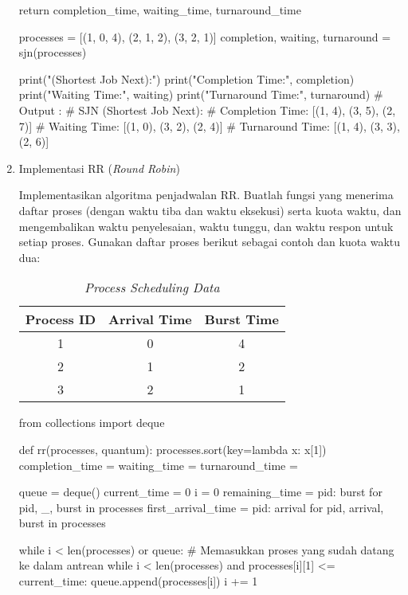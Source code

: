 \documentclass[12pt]{article}
\begin{document}
\begin{enumerate}
\begin{python}
    return completion_time, waiting_time, turnaround_time

processes = [(1, 0, 4), (2, 1, 2), (3, 2, 1)]
completion, waiting, turnaround = sjn(processes)

print("\nSJN (Shortest Job Next):")
print("Completion Time:", completion)
print("Waiting Time:", waiting)
print("Turnaround Time:", turnaround)
# Output : 
# SJN (Shortest Job Next):
# Completion Time: [(1, 4), (3, 5), (2, 7)]
# Waiting Time: [(1, 0), (3, 2), (2, 4)]
# Turnaround Time: [(1, 4), (3, 3), (2, 6)]
\end{python}
        
    \item Implementasi RR (\textit{Round Robin})
        \par  Implementasikan algoritma penjadwalan RR. Buatlah fungsi yang menerima daftar proses (dengan waktu tiba dan waktu eksekusi) serta kuota waktu, dan mengembalikan waktu penyelesaian, waktu tunggu, dan waktu respon untuk setiap proses. Gunakan daftar proses berikut sebagai contoh dan kuota waktu dua:
        \begin{table}[h!]
        \centering
        \begin{tabular}{|c|c|c|}
        \hline
        \textbf{Process ID} & \textbf{Arrival Time} & \textbf{Burst Time} \\ \hline
        1 & 0 & 4 \\ \hline
        2 & 1 & 2 \\ \hline
        3 & 2 & 1 \\ \hline
        \end{tabular}
        \caption{\textit{Process Scheduling Data}}
        \end{table}
        
\begin{python}
from collections import deque

def rr(processes, quantum):
    processes.sort(key=lambda x: x[1]) 
    completion_time = {}
    waiting_time = {}
    turnaround_time = {}
    
    queue = deque()
    current_time = 0
    i = 0
    remaining_time = {pid: burst for pid, _, burst in processes}
    first_arrival_time = {pid: arrival for pid, arrival, burst in processes}

    while i < len(processes) or queue:
        # Memasukkan proses yang sudah datang ke dalam antrean
        while i < len(processes) and processes[i][1] <= current_time:
            queue.append(processes[i])
            i += 1
        

\end{python}
\end{enumerate}
\end{document}

